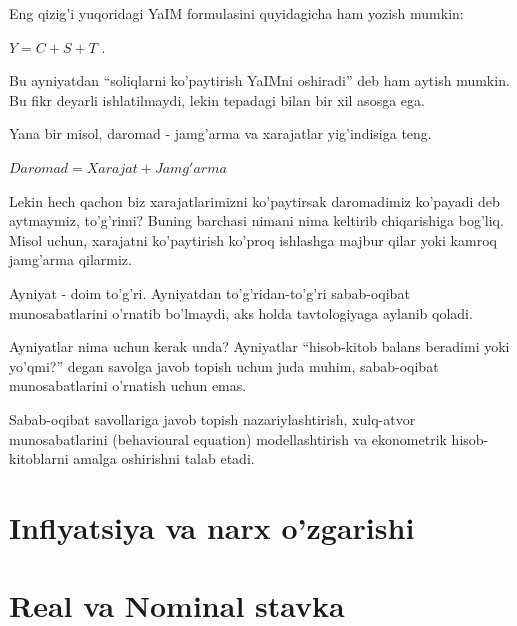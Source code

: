 \documentclass[
  letterpaper,
  DIV=11,
  numbers=noendperiod,
  oneside]{scrreprt}
\begin{document}
Eng qizig'i yuqoridagi YaIM formulasini quyidagicha ham yozish mumkin:

\(Y = C + S + T\) .

Bu ayniyatdan ``soliqlarni ko'paytirish YaIMni oshiradi'' deb ham aytish
mumkin. Bu fikr deyarli ishlatilmaydi, lekin tepadagi bilan bir xil
asosga ega.

Yana bir misol, daromad - jamg'arma va xarajatlar yig'indisiga teng.

\(Daromad = Xarajat + Jamg'arma\)

Lekin hech qachon biz xarajatlarimizni ko'paytirsak daromadimiz
ko'payadi deb aytmaymiz, to'g'rimi? Buning barchasi nimani nima keltirib
chiqarishiga bog'liq. Misol uchun, xarajatni ko'paytirish ko'proq
ishlashga majbur qilar yoki kamroq jamg'arma qilarmiz.

Ayniyat - doim to'g'ri. Ayniyatdan to'g'ridan-to'g'ri sabab-oqibat
munosabatlarini o'rnatib bo'lmaydi, aks holda tavtologiyaga aylanib
qoladi.

Ayniyatlar nima uchun kerak unda? Ayniyatlar ``hisob-kitob balans
beradimi yoki yo'qmi?'' degan savolga javob topish uchun juda muhim,
sabab-oqibat munosabatlarini o'rnatish uchun emas.

Sabab-oqibat savollariga javob topish nazariylashtirish, xulq-atvor
munosabatlarini (behavioural equation) modellashtirish va ekonometrik
hisob-kitoblarni amalga oshirishni talab etadi.


\hypertarget{inflyatsiya-va-narx-ozgarishi}{%
\chapter*{Inflyatsiya va narx
o'zgarishi}\label{inflyatsiya-va-narx-ozgarishi}}



\hypertarget{real-va-nominal-stavka}{%
\chapter*{Real va Nominal stavka}\label{real-va-nominal-stavka}}


\end{document}
